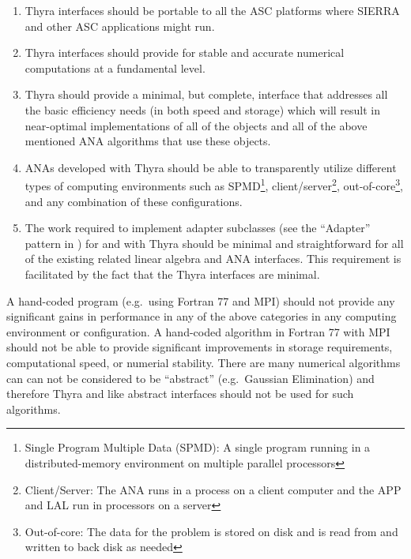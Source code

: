 \documentclass[pdf,ps2pdf,11pt]{SANDreport}
\begin{document}
\begin{enumerate}

{}\item Thyra interfaces should be portable to all the ASC
{}\cite{ref:doe_asci} platforms where SIERRA {}\cite{ref:SIERRA} and other ASC
applications might run.

{}\item Thyra interfaces should provide for stable and accurate numerical
computations at a fundamental level.

{}\item Thyra should provide a minimal, but complete, interface that addresses
all the basic efficiency needs (in both speed and storage) which will result
in near-optimal implementations of all of the objects and all of the above
mentioned ANA algorithms that use these objects.


{}\item ANAs developed with Thyra should be able to transparently utilize
different types of computing environments such as SPMD\footnote{Single Program
Multiple Data (SPMD): A single program running in a distributed-memory
environment on multiple parallel processors},
client/server\footnote{Client/Server: The ANA runs in a process on a client
computer and the APP and LAL run in processors on a server},
out-of-core\footnote{Out-of-core: The data for the problem is stored on disk
and is read from and written to back disk as needed}, and any combination of
these configurations.

{}\item The work required to implement adapter subclasses (see the ``Adapter''
pattern in {}\cite{ref:gama_et_al_1995}) for and with Thyra should be minimal
and straightforward for all of the existing related linear algebra and ANA
interfaces.  This requirement is facilitated by the fact that the Thyra
interfaces are minimal.

\end{enumerate}

A hand-coded program (e.g.~using Fortran 77 and MPI) should not provide any
significant gains in performance in any of the above categories in any
computing environment or configuration.  A hand-coded algorithm in Fortran 77
with MPI should not be able to provide significant improvements in storage
requirements, computational speed, or numerial stability.  There are many
numerical algorithms can can not be considered to be ``abstract'' (e.g.\
Gaussian Elimination) and therefore Thyra and like abstract interfaces should
not be used for such algorithms.
\end{document}
